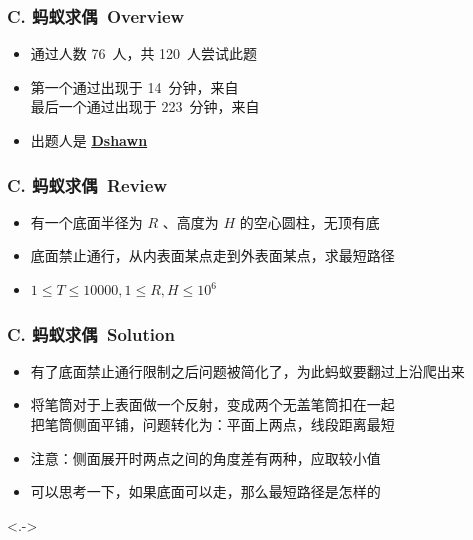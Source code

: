 \documentclass[notheorems]{beamer}
\newcommand{\zhProbC}{蚂蚁求偶}		\newcommand{\AuthProbC}{\textbf{\underline{\href{http://codeforces.com/profile/Phasianus}{Dshawn}}}}
\newcommand{\AccInProbC}{76}	\newcommand{\SubInProbC}{120}	\newcommand{\RatInProbC}{63.33\%}
\newcommand{\FirPenInProbC}{14}		\newcommand{\FirPerInProbC}{\NONE}
\newcommand{\LasPenInProbC}{223}	\newcommand{\LasPerInProbC}{\NONE}
\begin{document}
\begin{frame}[label = ProbC]
\frametitle{C. \zhProbC\ Overview}
\begin{spacing}{2.0} \large
\begin{itemize}[<+->]
\item 通过人数 \AccInProbC\ 人，共 \SubInProbC\ 人尝试此题
\item 第一个通过出现于 \FirPenInProbC\ 分钟，来自 \FirPerInProbC\ 
\\ 最后一个通过出现于 \LasPenInProbC\ 分钟，来自 \LasPerInProbC\ 
\item 出题人是 \AuthProbC\ 
\end{itemize}
\end{spacing}
\end{frame}
\begin{frame}
\frametitle{C. \zhProbC\ Review}
\begin{spacing}{2.0} \large
\begin{itemize}[<+->]
\item 有一个底面半径为 $R$ 、高度为 $H$ 的空心圆柱，无顶有底
\item \alert{底面禁止通行}，从内表面某点走到外表面某点，求最短路径
\item $1 \leq T \leq 10000, 1 \leq R, H \leq 10^6$
\end{itemize}
\end{spacing}
\end{frame}
\begin{frame}
\frametitle{C. \zhProbC\ Solution}
\begin{spacing}{2.0} \large
\begin{itemize}[<+->]
\item 有了\alert{底面禁止通行}限制之后问题被简化了，为此蚂蚁要翻过上沿爬出来
\item 将笔筒对于上表面做一个反射，变成两个无盖笔筒扣在一起 \\ 把笔筒侧面平铺，问题转化为：平面上两点，线段距离最短
\item 注意：侧面展开时两点之间的\alert{角度差有两种}，应取较小值
\item 可以思考一下，如果底面可以走，那么最短路径是怎样的
\end{itemize}
\end{spacing}
\visible<.->{\hyperlink{Overview}{}}
\end{frame}
\end{document}
